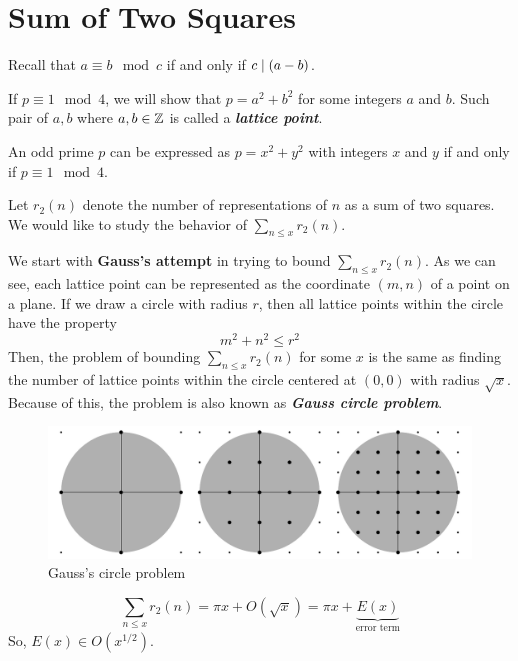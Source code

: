 \section{Sum of Two Squares}

Recall that $a \equiv b \mod c$ if and only if $c \mathrel{\mid} (a-b)$. 

If $p \equiv 1 \mod 4$, we will show that $p = a^2 + b^2$ for some integers $a$ and $b$. Such pair of $a,b$ where $a,b \in \mathbb{Z}$ is called a \textit{\textbf{lattice point}}.

\begin{theorem}
    An odd prime $p$ can be expressed as $p = x^2 + y^2$ with integers $x$ and $y$ if and only if $p \equiv 1 \mod 4$.
\end{theorem}

Let $r_2(n)$ denote the number of representations of $n$ as a sum of two squares. We would like to study the behavior of $\sum_{n \leq x} r_2(n)$.

We start with \textbf{Gauss's attempt} in trying to bound $\sum_{n \leq x} r_2(n)$. As we can see, each lattice point can be represented as the coordinate $(m,n)$ of a point on a plane. If we draw a circle with radius $r$, then all lattice points within the circle have the property
$$
m^2 + n^2 \leq r^2
$$
Then, the problem of bounding $\sum_{n\leq x}r_2(n)$ for some $x$ is the same as finding the number of lattice points within the circle centered at $(0,0)$ with radius $\sqrt{x}$. Because of this, the problem is also known as \textit{\textbf{Gauss circle problem}}.

\begin{figure}[htbp]
    \centering
    \includegraphics[width=0.5\linewidth]{figures/GausssCircleProblem.pdf}
    \caption{Gauss's circle problem}
    \label{fig:gauss-circle-prob}
\end{figure}

\begin{theorem}
    $$
    \sum_{n \leq x} r_2(n) = \pi x + O(\sqrt{x}) = \pi x + \underbrace{E(x)}_{\text{error term}}
    $$
    So, $E(x) \in O(x^{1/2})$.
\end{theorem}

